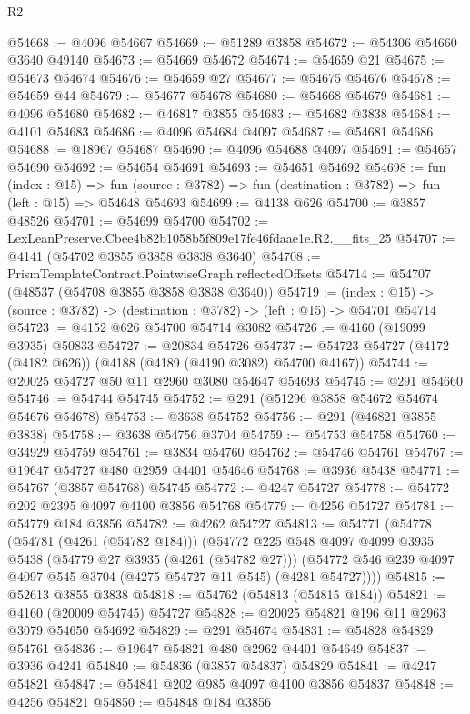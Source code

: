 \begin{lexlean}{R2}
\begin{coremodule}
@54668 := @4096 @54667
@54669 := @51289 @3858
@54672 := @54306 @54660 @3640 @49140
@54673 := @54669 @54672
@54674 := @54659 @21
@54675 := @54673 @54674
@54676 := @54659 @27
@54677 := @54675 @54676
@54678 := @54659 @44
@54679 := @54677 @54678
@54680 := @54668 @54679
@54681 := @4096 @54680
@54682 := @46817 @3855
@54683 := @54682 @3838
@54684 := @4101 @54683
@54686 := @4096 @54684 @4097
@54687 := @54681 @54686
@54688 := @18967 @54687
@54690 := @4096 @54688 @4097
@54691 := @54657 @54690
@54692 := @54654 @54691
@54693 := @54651 @54692
@54698 := fun (index : @15) =>
  fun (source : @3782) => fun (destination : @3782) => fun (left : @15) => @54648 @54693
@54699 := @4138 @626
@54700 := @3857 @48526
@54701 := @54699 @54700
@54702 := LexLeanPreserve.Cbee4b82b1058b5f809e17fe46fdaae1e.R2.__fits_25
@54707 := @4141 (@54702 @3855 @3858 @3838 @3640)
@54708 := PrismTemplateContract.PointwiseGraph.reflectedOffsets
@54714 := @54707 (@48537 (@54708 @3855 @3858 @3838 @3640))
@54719 := (index : @15) ->
  (source : @3782) -> (destination : @3782) -> (left : @15) -> @54701 @54714
@54723 := @4152 @626 @54700 @54714 @3082
@54726 := @4160 (@19099 @3935) @50833
@54727 := @20834 @54726
@54737 := @54723 @54727 (@4172 (@4182 @626)) (@4188 (@4189 (@4190 @3082) @54700 @4167))
@54744 := @20025 @54727 @50 @11 @2960 @3080 @54647 @54693
@54745 := @291 @54660
@54746 := @54744 @54745
@54752 := @291 (@51296 @3858 @54672 @54674 @54676 @54678)
@54753 := @3638 @54752
@54756 := @291 (@46821 @3855 @3838)
@54758 := @3638 @54756 @3704
@54759 := @54753 @54758
@54760 := @34929 @54759
@54761 := @3834 @54760
@54762 := @54746 @54761
@54767 := @19647 @54727 @480 @2959 @4401 @54646
@54768 := @3936 @5438
@54771 := @54767 (@3857 @54768) @54745
@54772 := @4247 @54727
@54778 := @54772 @202 @2395 @4097 @4100 @3856 @54768
@54779 := @4256 @54727
@54781 := @54779 @184 @3856
@54782 := @4262 @54727
@54813 := @54771
    (@54778
      (@54781 (@4261 (@54782 @184)))
      (@54772
        @225
        @548
        @4097
        @4099
        @3935
        @5438
        (@54779 @27 @3935 (@4261 (@54782 @27)))
        (@54772 @546 @239 @4097 @4097 @545 @3704 (@4275 @54727 @11 @545) (@4281 @54727))))
@54815 := @52613 @3855 @3838
@54818 := @54762 (@54813 (@54815 @184))
@54821 := @4160 (@20009 @54745) @54727
@54828 := @20025 @54821 @196 @11 @2963 @3079 @54650 @54692
@54829 := @291 @54674
@54831 := @54828 @54829 @54761
@54836 := @19647 @54821 @480 @2962 @4401 @54649
@54837 := @3936 @4241
@54840 := @54836 (@3857 @54837) @54829
@54841 := @4247 @54821
@54847 := @54841 @202 @985 @4097 @4100 @3856 @54837
@54848 := @4256 @54821
@54850 := @54848 @184 @3856

\end{coremodule}
\end{lexlean}
